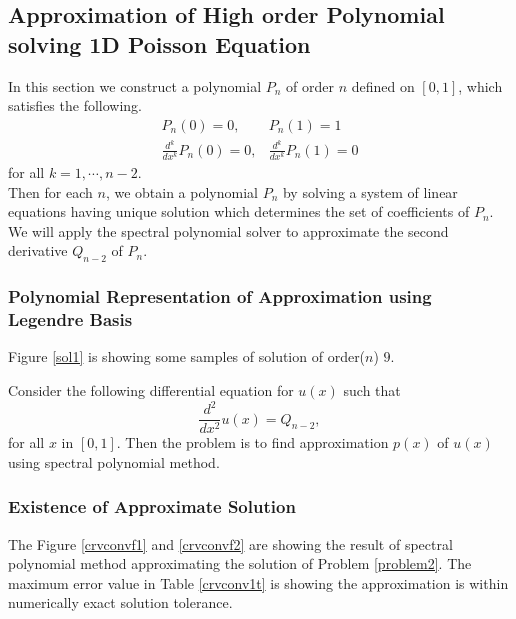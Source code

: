 \subsection {Approximation of High order Polynomial solving 1D Poisson Equation}

In this section we construct a polynomial $P_n$ of order $n$
defined on $[0,1]$, which satisfies the following.
\begin{eqnarray*}
 P_n(0) = 0, &P_n(1) = 1 \\
 \frac{d^k}{dx^k}P_n(0) = 0, &\frac{d^k}{dx^k}P_n(1) = 0
\end{eqnarray*}
for all $k = 1, \cdots, n-2$. \\
Then for each $n$, we obtain a polynomial $P_n$ by solving a
system of linear equations having unique solution which determines
the set of coefficients of $P_n$. We will apply the spectral
polynomial solver to approximate the second derivative $Q_{n-2}$
of $P_n$.

\subsubsection{Polynomial Representation of Approximation using Legendre Basis}




Figure \ref{sol1} is showing some samples of solution of
order($n$) $9$.

\begin{problem}
\label{problem2}Consider the following differential equation for
$u(x)$ such that
\begin{equation*}
    \frac{d^2}{dx^2} u(x) = Q_{n-2},
\end{equation*}
for all $x$ in $[0, 1]$. Then the problem is to find approximation
$p(x)$ of $u(x)$ using spectral polynomial method.
\end{problem}

\noindent



\subsubsection{Existence of Approximate Solution}

The Figure \ref{crvconvf1} and \ref{crvconvf2} are showing the
result of spectral polynomial method approximating the solution of
Problem \ref{problem2}. The maximum error value in Table
 \ref{crvconv1t} is showing the approximation is within numerically
exact solution tolerance.

